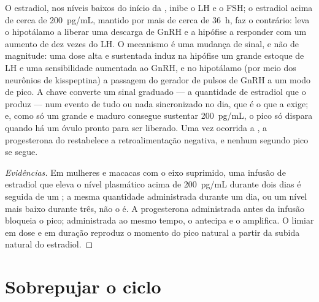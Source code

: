 \begin{theorem}\label{thm:b2:reproductive-hormones:switch}
O estradiol, nos níveis baixos do início da , inibe o LH
e o FSH; o estradiol acima de cerca de \qty{200}{pg/mL}, mantido por
mais de cerca de \qty{36}{h}, faz o contrário: leva o hipotálamo a
liberar uma descarga de GnRH e a hipófise a responder com um aumento
de dez vezes do LH. O mecanismo é uma mudança de sinal, e não de
magnitude: uma dose alta e sustentada induz na hipófise um grande
estoque de LH e uma sensibilidade aumentada ao GnRH, e no hipotálamo
(por meio dos neurônios de kisspeptina) a passagem do gerador de pulsos
de GnRH a um modo de pico. A chave converte um sinal graduado --- a
quantidade de estradiol que o  produz --- num evento de tudo ou
nada sincronizado no dia, que é o que a  exige; e, como só um
 grande e maduro consegue sustentar \qty{200}{pg/mL}, o pico
só dispara quando há um óvulo pronto para ser liberado. Uma vez
ocorrida a , a progesterona do  restabelece a
retroalimentação negativa, e nenhum segundo pico se segue.
\end{theorem}
\begin{proof}[Evidências]
Em mulheres e macacas com o eixo suprimido, uma infusão de estradiol
que eleva o nível plasmático acima de \qty{200}{pg/mL} durante dois
dias é seguida de um ; a mesma quantidade administrada
durante um dia, ou um nível mais baixo durante três, não o é. A
progesterona administrada antes da infusão bloqueia o pico;
administrada ao mesmo tempo, o antecipa e o amplifica. O limiar em
dose e em duração reproduz o momento do pico natural a partir da
subida natural do estradiol.
\end{proof}

\section{Sobrepujar o ciclo}

